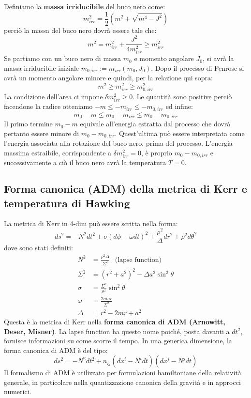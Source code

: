 Definiamo la \textbf{massa irriducibile} del buco nero come:
\begin{equation*}
    m^2_{irr} = \frac{1}{2}\left( m^2 +\sqrt{m^4 - J^2}\right)
\end{equation*}
perciò la massa del buco nero dovrà essere tale che:
\begin{equation*}
    m^2 = m_{irr}^2 + \frac{J^2}{4m_{irr}^2} \geq m_{irr}^2
\end{equation*}
Se partiamo con un buco nero di massa $m_0$ e momento angolare $J_0$, si avrà la massa irriducibile iniziale $m_{0, irr} := m_{irr}(m_0,J_0)$. Dopo il processo di Penrose si avrà un momento angolare minore e quindi, per la relazione qui sopra:
\begin{equation*}
    m^2 \geq m^{2}_{irr} \geq m^2_{0, irr}
\end{equation*}
La condizione dell'area ci impone $\delta m^2_{irr} \geq 0$. Le quantità sono positive perciò facendone la radice otteniamo $-m \leq - m_{irr} \leq - m_{0,irr}$ ed infine:
\begin{equation*}
    m_0 - m \leq m_0 - m_{irr} \leq m_0 - m_{0, irr}
\end{equation*}
Il primo termine $m_0 - m$ equivale all'energia estratta dal processo che dovrà pertanto essere minore di $m_0 - m_{0, irr}$. Quest'ultima può essere interpretata come l'energia associata alla rotazione del buco nero, prima del processo. L'energia massima estraibile, corrispondente a $\delta m^2_{irr} = 0$, è proprio $m_0 - m_{0,irr}$ e successivamente a ciò il buco nero avrà la temperatura $T =0$.

\subsection{Forma canonica (ADM) della metrica di Kerr e temperatura di Hawking} 
La metrica di Kerr in 4-dim può essere scritta nella forma:
\begin{equation}
    ds^2 = - N^2 dt^2 + \sigma( d\phi - \omega dt)^2 + \frac{\rho^2}{\Delta}dr^2 + \rho^2 d\theta^2
    \label{eq.metrica_kerr_adm}
\end{equation}
dove sono stati definiti:
\begin{align*}
    N^2 &= \frac{\rho^2 \Delta}{\Sigma^2} \ \ \textrm{ (lapse function)} \\
    \Sigma^2 &= (r^2 +a^2)^2 - \Delta a^2 \sin^2\theta \\
    \sigma &= \frac{\Sigma^2}{\rho^2}\sin^2\theta \\
    \omega &= \frac{2mar}{\Sigma^2} \\
    \Delta &= r^2 -2mr + a^2
\end{align*}
Questa è la metrica di Kerr nella \textbf{forma canonica di ADM (Arnowitt, Deser, Misner)}.
La lapse function ha questo nome poiché, posta davanti a $dt^2$, fornisce informazioni su come scorre il tempo. In una generica dimensione, la forma canonica di ADM è del tipo:
\begin{equation*}
    ds^2 = -N^2dt^2 + n_{ij}(dx^i - N^idt)(dx^j - N^jdt)
\end{equation*}
Il formalismo di ADM è utilizzato per formulazioni hamiltoniane della relatività generale, in particolare nella quantizzazione canonica della gravità e in approcci numerici.

